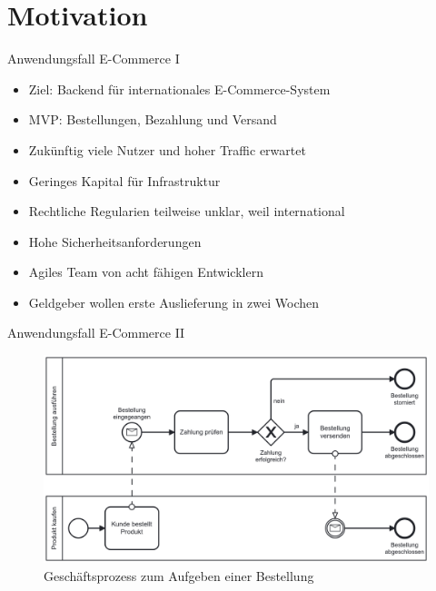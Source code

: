 \section*{Motivation}

\begin{frame}{Anwendungsfall E-Commerce I}
    \begin{itemize}
        \item Ziel: Backend für internationales E-Commerce-System
        \item MVP: Bestellungen, Bezahlung und Versand
        \item Zukünftig viele Nutzer und hoher Traffic erwartet
        \item Geringes Kapital für Infrastruktur
        \item Rechtliche Regularien teilweise unklar, weil international
        \item Hohe Sicherheitsanforderungen
        \item Agiles Team von acht fähigen Entwicklern
        \item Geldgeber wollen erste Auslieferung in zwei Wochen
    \end{itemize}
\end{frame}

\begin{frame}{Anwendungsfall E-Commerce II}
    \begin{figure}[!h]
        \centering
        \includegraphics[scale=0.12]{imglib/einleitung/ecommerce-order}
        \caption{Geschäftsprozess zum Aufgeben einer Bestellung}
        \label{fig:ecommerce}
    \end{figure}
\end{frame}

